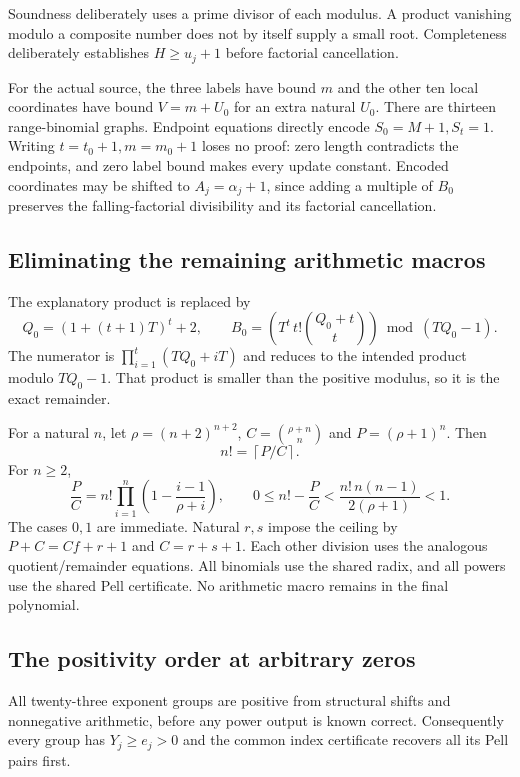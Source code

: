 Soundness deliberately uses a prime
divisor of each modulus. A product
vanishing modulo a composite number
does not by itself supply a small root.
Completeness deliberately establishes
$H\ge u_j+1$ before factorial cancellation.

For the actual source, the three labels
have bound $m$ and the other ten local
coordinates have bound $V=m+U_0$ for an
extra natural $U_0$. There are thirteen
range-binomial graphs. Endpoint equations
directly encode $S_0=M+1,S_t=1$.
Writing $t=t_0+1,m=m_0+1$ loses no proof:
zero length contradicts the endpoints,
and zero label bound makes every update
constant. Encoded coordinates may be
shifted to $A_j=\alpha_j+1$, since adding
a multiple of $B_0$ preserves the
falling-factorial divisibility and its
factorial cancellation.

\subsection{Eliminating the remaining arithmetic macros}

The explanatory product is replaced by
\[
 Q_0=(1+(t+1)T)^t+2,\qquad
 B_0=
 \left(T^t\,t!\binom{Q_0+t}{t}\right)\bmod(TQ_0-1).
\]
The numerator is
$\prod_{i=1}^t(TQ_0+iT)$ and reduces
to the intended product modulo $TQ_0-1$.
That product is smaller than the
positive modulus, so it is the exact
remainder.

For a natural $n$, let
$\rho=(n+2)^{n+2}$,
$C=\binom{\rho+n}{n}$ and
$P=(\rho+1)^n$. Then
\[
 n!=\left\lceil P/C\right\rceil.
\]
For $n\ge2$,
\[
 \frac PC=n!\prod_{i=1}^n
 \left(1-\frac{i-1}{\rho+i}\right),
 \qquad
 0\le n!-\frac PC
 <\frac{n!\,n(n-1)}{2(\rho+1)}<1.
\]
The cases $0,1$ are immediate.
Natural $r,s$ impose the ceiling by
$P+C=Cf+r+1$ and $C=r+s+1$.
Each other division uses the analogous
quotient/remainder equations.
All binomials use the shared radix,
and all powers use the shared Pell
certificate. No arithmetic macro
remains in the final polynomial.

\subsection{The positivity order at arbitrary zeros}

All twenty-three exponent groups are
positive from structural shifts and
nonnegative arithmetic, before any
power output is known correct.
Consequently every group has
$Y_j\ge e_j>0$ and the common index
certificate recovers all its Pell
pairs first.

